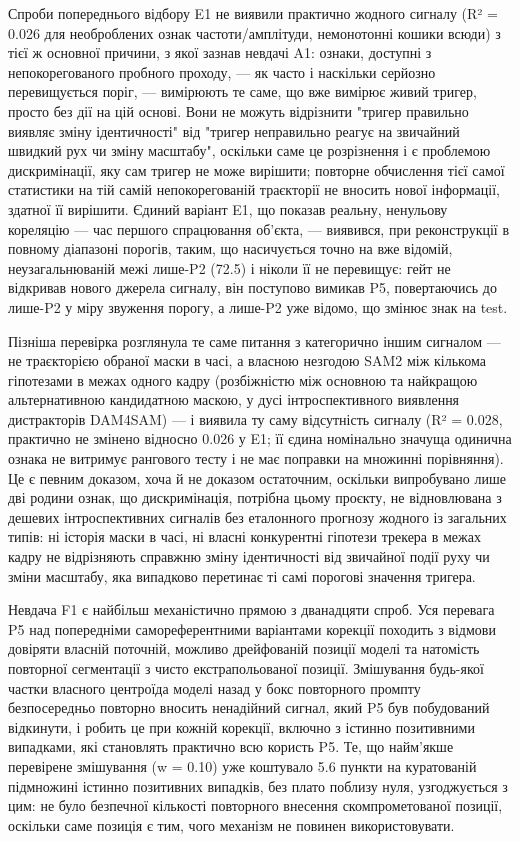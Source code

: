 \documentclass[11pt]{article}
\begin{document}
Спроби попереднього відбору E1 не виявили практично жодного сигналу (R² = 0.026 для необроблених ознак частоти/амплітуди, немонотонні кошики всюди) з тієї ж основної причини, з якої зазнав невдачі A1: ознаки, доступні з непокорегованого пробного проходу, --- як часто і наскільки серйозно перевищується поріг, --- вимірюють те саме, що вже вимірює живий тригер, просто без дії на цій основі. Вони не можуть відрізнити "тригер правильно виявляє зміну ідентичності" від "тригер неправильно реагує на звичайний швидкий рух чи зміну масштабу", оскільки саме це розрізнення і є проблемою дискримінації, яку сам тригер не може вирішити; повторне обчислення тієї самої статистики на тій самій непокорегованій траєкторії не вносить нової інформації, здатної її вирішити. Єдиний варіант E1, що показав реальну, ненульову кореляцію --- час першого спрацювання об'єкта, --- виявився, при реконструкції в повному діапазоні порогів, таким, що насичується точно на вже відомій, неузагальнюваній межі лише-P2 (72.5) і ніколи її не перевищує: гейт не відкривав нового джерела сигналу, він поступово вимикав P5, повертаючись до лише-P2 у міру звуження порогу, а лише-P2 уже відомо, що змінює знак на test.

Пізніша перевірка розглянула те саме питання з категорично іншим сигналом --- не траєкторією обраної маски в часі, а власною незгодою SAM2 між кількома гіпотезами в межах одного кадру (розбіжністю між основною та найкращою альтернативною кандидатною маскою, у дусі інтроспективного виявлення дистракторів DAM4SAM) --- і виявила ту саму відсутність сигналу (R² = 0.028, практично не змінено відносно 0.026 у E1; її єдина номінально значуща одинична ознака не витримує рангового тесту і не має поправки на множинні порівняння). Це є певним доказом, хоча й не доказом остаточним, оскільки випробувано лише дві родини ознак, що дискримінація, потрібна цьому проєкту, не відновлювана з дешевих інтроспективних сигналів без еталонного прогнозу жодного із загальних типів: ні історія маски в часі, ні власні конкурентні гіпотези трекера в межах кадру не відрізняють справжню зміну ідентичності від звичайної події руху чи зміни масштабу, яка випадково перетинає ті самі порогові значення тригера.

Невдача F1 є найбільш механістично прямою з дванадцяти спроб. Уся перевага P5 над попередніми самореферентними варіантами корекції походить з відмови довіряти власній поточній, можливо дрейфованій позиції моделі та натомість повторної сегментації з чисто екстрапольованої позиції. Змішування будь-якої частки власного центроїда моделі назад у бокс повторного промпту безпосередньо повторно вносить ненадійний сигнал, який P5 був побудований відкинути, і робить це при кожній корекції, включно з істинно позитивними випадками, які становлять практично всю користь P5. Те, що найм'якше перевірене змішування (w = 0.10) уже коштувало 5.6 пункти на куратованій підмножині істинно позитивних випадків, без плато поблизу нуля, узгоджується з цим: не було безпечної кількості повторного внесення скомпрометованої позиції, оскільки саме позиція є тим, чого механізм не повинен використовувати.
\end{document}
